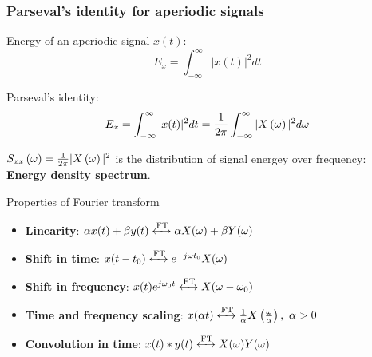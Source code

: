 \documentclass[aspectratio=169]{beamer}
\let\olditem\item
\renewcommand{\item}{\setlength{\itemsep}{\fill}\olditem}
\def\lp{\ensuremath\left(}
\def\rp{\ensuremath\right)}
\begin{document}
\begin{frame}[t]
  \frametitle{Parseval's identity for aperiodic signals}

  Energy of an aperiodic signal $x(t)$:
  \[ E_x = \int_{-\infty}^{\infty} \vert x(t) \vert^2 dt \]

  Parseval's identity:
  \[ E_x = \int_{-\infty}^{\infty} \vert x(t) \vert^2 dt = \frac{1}{2\pi}\int_{-\infty}^{\infty} \vert X\lp \omega \rp\vert^2 d\omega \]
  
  $S_{xx}\lp \omega \rp = \frac{1}{2\pi}\vert X\lp \omega \rp\vert^2$ is the distribution of signal energey over frequency: \textbf{Energy density spectrum}.

\end{frame}


\begin{frame}{Properties of Fourier transform}
\begin{itemize}
\item \textbf{Linearity}: $\alpha x(t) + \beta y(t) \xleftrightarrow{\text{FT}} \alpha X(\omega) + \beta Y(\omega)$
\item \textbf{Shift in time}: $ x(t-t_0) \xleftrightarrow{\text{FT}} e^{-j\omega t_0}X(\omega)$
\item \textbf{Shift in frequency}: $ x(t)e^{j\omega_0 t} \xleftrightarrow{\text{FT}} X(\omega - \omega_0) $
\item \textbf{Time and frequency scaling}: $ x(\alpha t) \xleftrightarrow{\text{FT}} \frac{1}{\alpha} X\left(\frac{\omega}{\alpha}\right), \,\, \alpha > 0 $
\item \textbf{Convolution in time}: $x(t) * y(t) \xleftrightarrow{\text{FT}} X(\omega)Y(\omega) $
\end{itemize}
\end{frame}
\end{document}
